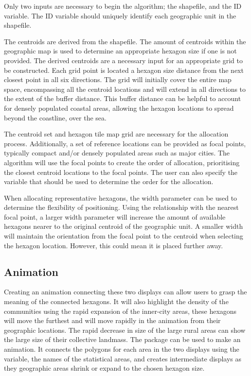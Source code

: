 Only two inputs are necessary to begin the algorithm; the shapefile, and
the ID variable. The ID variable should uniquely identify each
geographic unit in the shapefile.

The centroids are derived from the shapefile. The amount of centroids
within the geographic map is used to determine an appropriate hexagon
size if one is not provided. The derived centroids are a necessary input
for an appropriate grid to be constructed. Each grid point is located a
hexagon size distance from the next closest point in all six directions.
The grid will initially cover the entire map space, encompassing all the
centroid locations and will extend in all directions to the extent of
the buffer distance. This buffer distance can be helpful to account for
densely populated coastal areas, allowing the hexagon locations to
spread beyond the coastline, over the sea.

The centroid set and hexagon tile map grid are necessary for the
allocation process. Additionally, a set of reference locations can be
provided as focal points, typically compact and/or densely populated
areas such as major cities. The algorithm will use the focal points to
create the order of allocation, prioritising the closest centroid
locations to the focal points. The user can also specify the variable
that should be used to determine the order for the allocation.

When allocating representative hexagons, the width parameter can be used
to determine the flexibility of positioning. Using the relationship with
the nearest focal point, a larger width parameter will increase the
amount of available hexagons nearer to the original centroid of the
geographic unit. A smaller width will maintain the orientation from the
focal point to the centroid when selecting the hexagon location.
However, this could mean it is placed further away.

\hypertarget{animation}{%
\subsection{Animation}\label{animation}}

Creating an animation connecting these two displays can allow users to
grasp the meaning of the connected hexagons. It will also highlight the
density of the communities using the rapid expansion of the inner-city
areas, these hexagons will move the furthest and will move rapidly in
the animation from their geographic locations. The rapid decrease in
size of the large rural areas can show the large size of their
collective landmass. The  \citep{gganimate} package
can be used to make an animation. It connects the polygons for each area
in the two displays using the  variable, the names of the
statistical areas, and creates intermediate displays as they geographic
areas shrink or expand to the chosen hexagon size.

